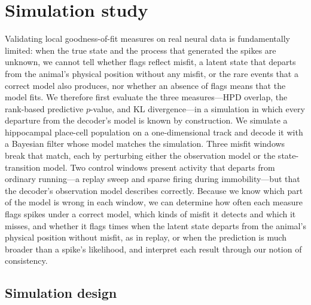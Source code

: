 \documentclass[12pt]{article}
\begin{document}
\section*{Simulation study}\label{sec:simstudy}
Validating local goodness-of-fit measures on real neural data is fundamentally limited: when the true state and the process that generated the spikes are unknown, we cannot tell whether flags reflect misfit, a latent state that departs from the animal's physical position without any misfit, or the rare events that a correct model also produces, nor whether an absence of flags means that the model fits. We therefore first evaluate the three measures---HPD overlap, the rank-based predictive $p$-value, and KL divergence---in a simulation in which every departure from the decoder's model is known by construction. We simulate a hippocampal place-cell population on a one-dimensional track and decode it with a Bayesian filter whose model matches the simulation. Three misfit windows break that match, each by perturbing either the observation model or the state-transition model. Two control windows present activity that departs from ordinary running---a replay sweep and sparse firing during immobility---but that the decoder's observation model describes correctly. Because we know which part of the model is wrong in each window, we can determine how often each measure flags spikes under a correct model, which kinds of misfit it detects and which it misses, and whether it flags times when the latent state departs from the animal's physical position without misfit, as in replay, or when the prediction is much broader than a spike's likelihood, and interpret each result through our notion of consistency.

\subsection*{Simulation design}\label{sec:generative}
\end{document}
